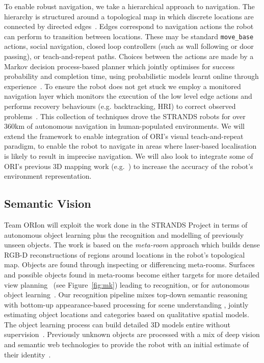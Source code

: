 \documentclass[runningheads,a4paper]{llncs}
\newcommand{\teamori}{Team ORIon}
\begin{document}
To enable robust navigation, we take a hierarchical approach to navigation. The hierarchy is structured around a topological map in which discrete locations are connected by directed edges~\cite{jpulido2015NowOrLater}. Edges correspond to navigation actions the robot can perform to transition between locations. These may be standard \texttt{move\_base} actions, social navigation, closed loop controllers (such as wall following or door passing), or teach-and-repeat paths. Choices between the actions are made by a Markov decision process-based planner which jointly optimises for success probability and completion time, using probabilistic models learnt online through experience~\cite{LPH14b}. To ensure the robot does not get stuck we employ a monitored navigation layer which monitors the execution of the low level edge actions and performs recovery behaviours (e.g. backtracking, HRI) to correct observed problems~\cite{strands@ram}. This collection of techniques drove the STRANDS robots for over 360km of autonomous navigation in human-populated environments. We will extend the framework to enable integration of ORI's visual teach-and-repeat paradigm, to enable the robot to navigate in areas where laser-based localisation is likely to result in imprecise navigation. We will also look to integrate some of ORI's previous 3D mapping work (e.g.~\cite{AmayoICRA2016}) to increase the accuracy of the robot's environment representation. 

\subsection{Semantic Vision}
\teamori{} will exploit the work done in the STRANDS Project in terms of autonomous object learning plus the recognition and modelling of previously unseen objects. The work is based on the \emph{meta-room} approach which builds dense RGB-D reconstructions of regions around locations in the robot's topological map. Objects are found through inspecting or differencing meta-rooms. Surfaces and possible objects found in meta-rooms become either targets for more detailed view planning~\cite{kunze14indirect} (see Figure~\ref{fig:mk}) leading to recognition, or for autonomous object learning~\cite{Faeulhammer:2016}. Our recognition pipeline mixes top-down semantic reasoning with bottom-up appearance-based processing for scene understanding \cite{kunze14topdown}, jointly estimating object locations and categories based on qualitative spatial models\cite{kunze14bootstrapping}. The object learning process can build detailed 3D models entire without supervision~\cite{Faeulhammer:2016}. Previously unknown objects are processed with a mix of deep vision and semantic web technologies to provide the robot with an initial estimate of their identity~\cite{aloof@icra17}.
\end{document}
